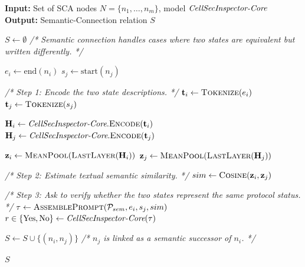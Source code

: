 \begin{algorithm}[ht]
\caption{Semantic Connection}
\label{alg:semantic_connection}
\scriptsize
\begin{algorithmic}[1]

\State \textbf{Input:} Set of SCA nodes $N=\{n_1,\dots,n_m\}$, model $\textit{CellSecInspector-Core}$
\State \textbf{Output:} Semantic-Connection relation $S$

\State $S \leftarrow \emptyset$
\State \textit{/* Semantic connection handles cases where two states are equivalent but written differently. */}


    \State $e_i \leftarrow \text{end}(n_i)$
    \State $s_j \leftarrow \text{start}(n_j)$


        \State \textit{/* Step 1: Encode the two state descriptions. */}
        \State $\mathbf{t}_i \leftarrow \textsc{Tokenize}(e_i)$
        \State $\mathbf{t}_j \leftarrow \textsc{Tokenize}(s_j)$

        \State $\mathbf{H}_i \leftarrow \textit{CellSecInspector-Core}.\textsc{Encode}(\mathbf{t}_i)$
        \State $\mathbf{H}_j \leftarrow \textit{CellSecInspector-Core}.\textsc{Encode}(\mathbf{t}_j)$

        \State $\mathbf{z}_i \leftarrow \textsc{MeanPool}(\textsc{LastLayer}(\mathbf{H}_i))$
        \State $\mathbf{z}_j \leftarrow \textsc{MeanPool}(\textsc{LastLayer}(\mathbf{H}_j))$

        \State \textit{/* Step 2: Estimate textual semantic similarity. */}
        \State $sim \leftarrow \textsc{Cosine}(\mathbf{z}_i,\mathbf{z}_j)$

        \State \textit{/* Step 3: Ask \core to verify whether the two states represent the same protocol status. */}
        \State $\tau \leftarrow \textsc{AssemblePrompt}(\mathcal{P}_{sem}, e_i, s_j, sim)$
        \State $r \in \{\text{Yes},\text{No}\} \leftarrow \textit{CellSecInspector-Core}(\tau)$

            \State $S \leftarrow S \cup \{(n_i,n_j)\}$
            \State \textit{/* $n_j$ is linked as a semantic successor of $n_i$. */}
        \EndIf

    \EndIf

\EndFor

\State \Return $S$

\end{algorithmic}
\end{algorithm}

